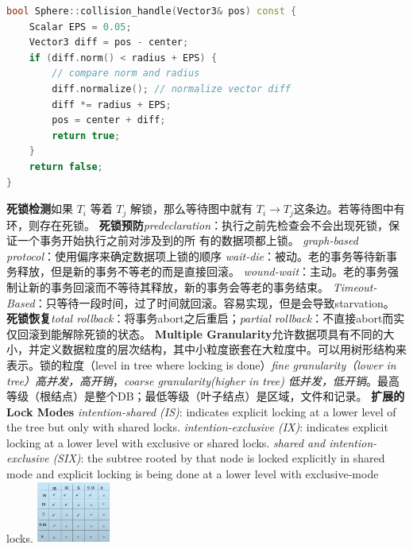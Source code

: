 \documentclass[]{article}
\begin{document}
\begin{multicols}{3}
\begin{lstlisting}[language=c++]
bool Sphere::collision_handle(Vector3& pos) const {
    Scalar EPS = 0.05;
    Vector3 diff = pos - center;
    if (diff.norm() < radius + EPS) {
        // compare norm and radius
        diff.normalize(); // normalize vector diff
        diff *= radius + EPS;
        pos = center + diff;
        return true;
    }
    return false;
}
\end{lstlisting}


\textbf{死锁检测}如果 $T_i$ 等着 $T_j$ 解锁，那么等待图中就有 $T_i \to T_j$这条边。若等待图中有环，则存在死锁。
\textbf{死锁预防}\textit{predeclaration}：执行之前先检查会不会出现死锁，保证一个事务开始执行之前对涉及到的所
有的数据项都上锁。
\textit{graph-based protocol}：使用偏序来确定数据项上锁的顺序
\textit{wait-die}：被动。老的事务等待新事务释放，但是新的事务不等老的而是直接回滚。
\textit{wound-wait}：主动。老的事务强制让新的事务回滚而不等待其释放，新的事务会等老的事务结束。
\textit{Timeout-Based}：只等待一段时间，过了时间就回滚。容易实现，但是会导致starvation。
\textbf{死锁恢复}\textit{total rollback}：将事务abort之后重启；\textit{partial rollback}：不直接abort而实仅回滚到能解除死锁的状态。
\textbf{Multiple Granularity}允许数据项具有不同的大小，并定义数据粒度的层次结构，其中小粒度嵌套在大粒度中。可以用树形结构来表示。锁的粒度（level in tree where locking is done）\textit{fine granularity（lower in tree）高并发，高开销}，\textit{coarse granularity(higher in tree) 低并发，低开销}。最高等级（根结点）是整个DB；最低等级（叶子结点）是区域，文件和记录。
\textbf{扩展的Lock Modes}
\textit{intention-shared (IS)}: indicates explicit locking at a lower level of the tree but only with shared locks.
\textit{intention-exclusive (IX)}: indicates explicit locking at a lower level with exclusive or shared locks.
\textit{shared and intention-exclusive (SIX)}: the subtree rooted by that node is locked explicitly in shared mode and explicit locking is being done at a lower level with exclusive-mode locks.
\includegraphics[height=20mm]{./img/lock.png}


\end{multicols}
\end{document}
